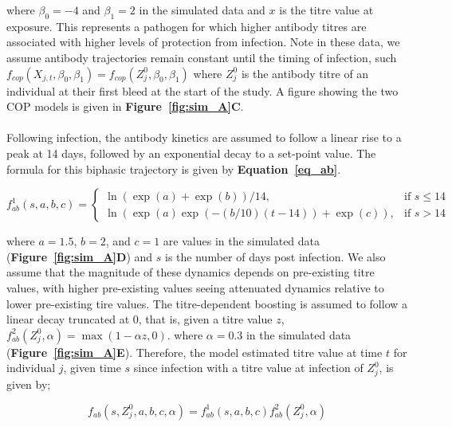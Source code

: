 where $\beta_0 = -4$ and $\beta_1 = 2$ in the simulated data and $x$ is the titre value at exposure. This represents a pathogen for which higher antibody titres are associated with higher levels of protection from infection. Note in these data, we assume antibody trajectories remain constant until the timing of infection, such $f_{cop}(X_{j, t}, \beta_0, \beta_1) = f_{cop}(Z^0_{j}, \beta_0, \beta_1)$ where $Z^0_{j}$ is the antibody titre of an individual at their first bleed at the start of the study.  A figure showing the two COP models is given in \textbf{Figure~\ref{fig:sim_A}C}.


\paragraph{}Following infection, the antibody kinetics are assumed to follow a linear rise to a peak at 14 days, followed by an exponential decay to a set-point value.\cite{Srivastava2023-of} The formula for this biphasic trajectory is given by \textbf{Equation~\ref{eq_ab}}.

\begin{equation}
\label{eq_ab}
f^1_{ab}(s, a, b, c) =
\begin{cases}
  \ln(\exp(a) + \exp(b)) / 14, & \text{if }s \leq 14 \\
  \ln(\exp(a) \exp(-(b/10)(t - 14)) + \exp(c)), &\text{if } s > 14
\end{cases}
\end{equation}

where $a = 1.5$, $b = 2$, and $c = 1$ are values in the simulated data (\textbf{Figure~\ref{fig:sim_A}D}) and $s$ is the number of days post infection. We also assume that the magnitude of these dynamics depends on pre-existing titre values, with higher pre-existing values seeing attenuated dynamics relative to lower pre-existing tire values. The titre-dependent boosting is assumed to follow a linear decay truncated at 0, that is, given a titre value $z$, $f^2_{ab}(Z_j^0, \alpha) = \max(1 - \alpha z, 0)$. where $\alpha = 0.3$ in the simulated data (\textbf{Figure~\ref{fig:sim_A}E}). Therefore, the model estimated titre value at time $t$ for individual $j$, given time $s$ since infection with a titre value at infection of $Z_{j}^0$, is given by;  

\begin{equation}
\label{eq_ab2}
f_{ab}(s, Z^0_{j}, a, b, c, \alpha) = f^1_{ab}(s, a, b, c)f^2_{ab}(Z^0_{j}, \alpha) 
\end{equation}


